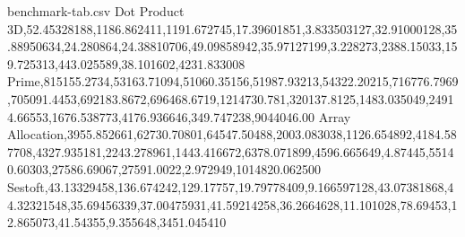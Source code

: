 \begin{filecontents*}{benchmark-tab.csv}
Dot Product 3D,52.45328188,1186.862411,1191.672745,17.39601851,3.833503127,32.91000128,35.88950634,24.280864,24.38810706,49.09858942,35.97127199,3.228273,2388.15033,159.725313,443.025589,38.101602,4231.833008
Prime,815155.2734,53163.71094,51060.35156,51987.93213,54322.20215,716776.7969,705091.4453,692183.8672,696468.6719,1214730.781,320137.8125,1483.035049,24914.66553,1676.538773,4176.936646,349.747238,9044046.00
Array Allocation,3955.852661,62730.70801,64547.50488,2003.083038,1126.654892,4184.587708,4327.935181,2243.278961,1443.416672,6378.071899,4596.665649,4.87445,55140.60303,27586.69067,27591.0022,2.972949,1014820.062500
Sestoft,43.13329458,136.674242,129.17757,19.79778409,9.166597128,43.07381868,44.32321548,35.69456339,37.00475931,41.59214258,36.2664628,11.101028,78.69453,12.865073,41.54355,9.355648,3451.045410
\end{filecontents*}

